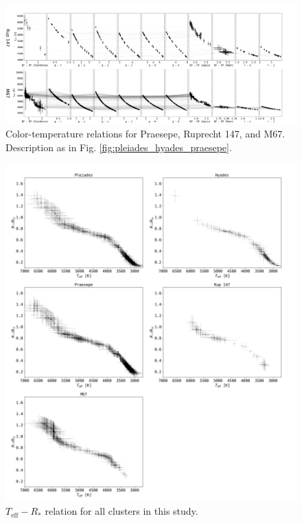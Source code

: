 \documentclass{aa}
\begin{document}
   \begin{figure}
		\centering
           \includegraphics[angle=90, width=0.56\hsize]{pics/clusters/Teff_spread_old.png}

      \caption{Color-temperature relations for Praesepe, Ruprecht 147, and M67. Description as in Fig. \ref{fig:pleiades_hyades_praesepe}.}
         \label{praesepe_ngc6774_ngc2682}
   \end{figure}   



   \begin{figure}
		\centering
           \includegraphics[width=\hsize]{pics/clusters/teff_R.png}

      \caption{$T_\mathrm{eff}-R_*$ relation for all clusters in this study.}
         \label{teff_R}
   \end{figure}   
\end{document}
